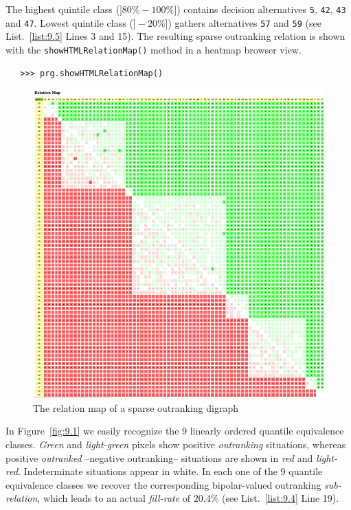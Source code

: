 The highest quintile class ($]80\%-100\%]$) contains decision alternatives \texttt{5}, \texttt{42}, \texttt{43} and \texttt{47}. Lowest quintile class ($]-20\%]$) gathers alternatives \texttt{57} and \texttt{59} (see List.~\vref{list:9.5} Lines 3 and 15). The resulting sparse outranking relation is shown with the \texttt{showHTMLRelationMap()} method in a heatmap browser view.
\begin{lstlisting}
   >>> prg.showHTMLRelationMap()
\end{lstlisting}
\begin{figure}[ht]
\includegraphics[width=\hsize]{Figures/9-1-sparse75RelationMap.png}
\caption{The relation map of a sparse outranking digraph}
\label{fig:9.1}       %
\end{figure}

In Figure~\vref{fig:9.1} we easily recognize the 9 linearly ordered quantile equivalence classes. \emph{Green} and \emph{light-green} pixels show positive \emph{outranking} situations, whereas positive \emph{outranked} --negative outranking-- situations are shown in \emph{red} and \emph{light-red}. Indeterminate situations appear in white. In each one of the 9 quantile equivalence classes we recover the corresponding bipolar-valued outranking \emph{sub-relation}, which leads to an actual \emph{fill-rate} of $20.4\%$ (see List.~\vref{list:9.4} Line 19).

